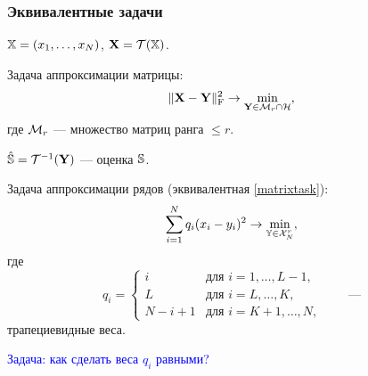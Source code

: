\documentclass[unicode, notheorems]{beamer}
\begin{document}
\begin{frame}
	\frametitle{Эквивалентные задачи}
	\vspace{-0.2cm}
	$\mathbb{X} = (x_1, \ldots, x_N)$, $\mathbf{X} = \mathcal{T}(\mathbb{X})$. 
	
	Задача аппроксимации матрицы:
	\begin{equation} \label{matrixtask}
	\|\mathbf{X} - \mathbf{Y}\|^2_{\mathrm{F}} \to \min_{\substack{\mathbf{Y} \in \mathcal{M}_r \cap \mathcal{H}}},
	\end{equation}
	где $\mathcal{M}_r$ --- множество матриц ранга $\le r$.
	
	$\hat {\mathbb{S}} = \mathcal{T}^{-1}(\mathbf{Y})$ --- оценка $\mathbb{S}$.
	
	Задача аппроксимации рядов (эквивалентная \eqref{matrixtask}):
	\begin{equation*}
	\sum \limits_{i=1}^N q_i(x_i - y_i)^2 \to \min_{\mathbb{Y} \in \mathcal{X}_N^r},
	\end{equation*}
	где	\begin{equation*}
	q_i = \begin{cases}
	i & \text{для $i = 1, \ldots, L-1,$}\\
	L & \text{для $i = L, \ldots, K,$}\\
	N - i + 1 & \text{для $i = K + 1, \ldots, N,$}
	\end{cases} \qquad \text{---}
	\end{equation*}
	трапециевидные веса.
	
	\textcolor{blue}{Задача: как сделать веса $q_i$ равными?}
\end{frame}

\end{document}

